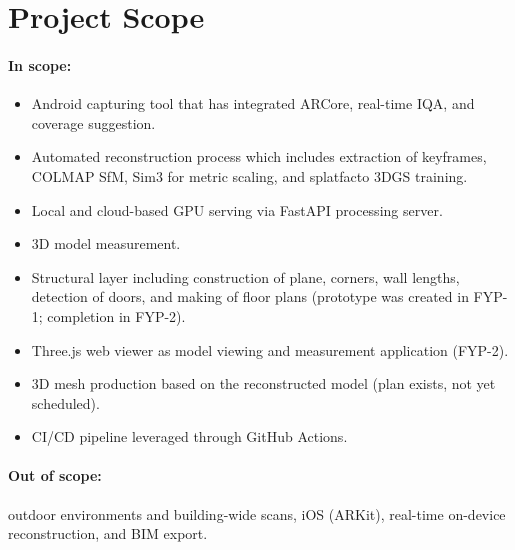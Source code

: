 \section{Project Scope}

\paragraph{In scope:}
\begin{itemize}
    \item Android capturing tool that has integrated ARCore, real-time IQA, and coverage suggestion.
    \item Automated reconstruction process which includes extraction of keyframes, COLMAP SfM, Sim3 for metric scaling, and splatfacto 3DGS training.
    \item Local and cloud-based GPU serving via FastAPI processing server.
    \item 3D model measurement.
    \item Structural layer including construction of plane, corners, wall lengths, detection of doors, and making of floor plans (prototype was created in FYP-1; completion in FYP-2).
    \item Three.js web viewer as model viewing and measurement application (FYP-2).
    \item 3D mesh production based on the reconstructed model (plan exists, not yet scheduled).
    \item CI/CD pipeline leveraged through GitHub Actions.
\end{itemize}

\paragraph{Out of scope:} outdoor environments and building-wide scans, iOS (ARKit), real-time on-device reconstruction, and BIM export.

